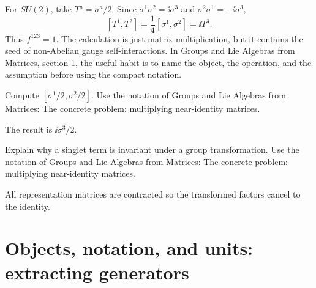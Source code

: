 \begin{example}
For \(SU(2)\), take \(T^a=\sigma^a/2\).  Since \(\sigma^1\sigma^2=\ii\sigma^3\) and \(\sigma^2\sigma^1=-\ii\sigma^3\),
\[
  [T^1,T^2]=\frac14[\sigma^1,\sigma^2]=\ii T^3.
\]
Thus \(f^{123}=1\).  The calculation is just matrix multiplication, but it contains the seed of non-Abelian gauge self-interactions.  In Groups and Lie Algebras from Matrices, section 1, the useful habit is to name the object, the operation, and the assumption before using the compact notation.
\end{example}



\begin{exercise}
Compute \([\sigma^1/2,\sigma^2/2]\).  Use the notation of Groups and Lie Algebras from Matrices: The concrete problem: multiplying near-identity matrices.
\begin{answer}
The result is \(\ii\sigma^3/2\).
\end{answer}
\end{exercise}

\begin{exercise}
Explain why a singlet term is invariant under a group transformation.  Use the notation of Groups and Lie Algebras from Matrices: The concrete problem: multiplying near-identity matrices.
\begin{answer}
All representation matrices are contracted so the transformed factors cancel to the identity.
\end{answer}
\end{exercise}



\section{Objects, notation, and units: extracting generators}













